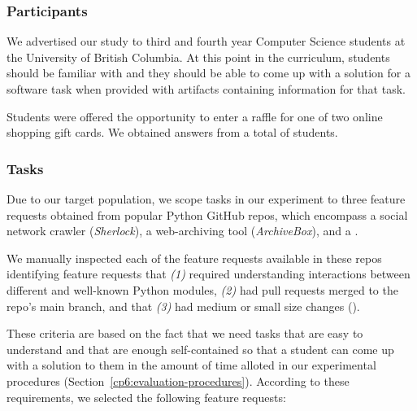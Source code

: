 \subsubsection{Participants}



We advertised our study to third and fourth year Computer Science students at the University of British Columbia. 
At this point in the curriculum, students should be familiar with  and they should be able to come up with a solution 
for a software task when provided with artifacts containing information for that task.


Students were offered the opportunity to enter a raffle for one of two  online shopping gift cards.
We obtained answers from a total of \red{\#} students. 











\subsubsection{Tasks}

Due to our target population, we scope tasks in our experiment to three 
feature requests obtained from popular Python GitHub repos,
which encompass a social network crawler (\textit{Sherlock}),
a web-archiving tool (\textit{ArchiveBox}), and a .








We manually inspected each of the feature requests available in these repos identifying
feature requests that
\textit{(1)}  required understanding interactions between different and well-known Python modules, 
\textit{(2)}  had pull requests merged to the repo's main branch, and that
\textit{(3)}  had medium or small size changes ().


These criteria are based on the fact that we need tasks that are easy to understand and that are enough self-contained so that a student can come up with a solution to them in the amount of time alloted in our experimental procedures (Section~\ref{cp6:evaluation-procedures}).
According to these requirements, we selected the following feature requests:


